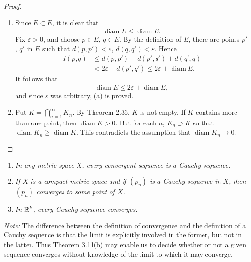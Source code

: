 \begin{proof}
\begin{enumerate}[label=(\alph*), leftmargin=2.2em, itemsep=4pt, topsep=3pt]
  \item Since $E \subset \overline{E}$, it is clear that
        \[ \operatorname{diam} E \le \operatorname{diam} \overline{E}. \]
        Fix $\varepsilon > 0$, and choose $p \in \overline{E}$,
        $q \in \overline{E}$. By the definition of $\overline{E}$, there are
        points $p'$, $q'$ in $E$ such that $d(p,p') < \varepsilon$,
        $d(q,q') < \varepsilon$. Hence
        \begin{align*}
          d(p,q) &\le d(p,p') + d(p',q') + d(q',q)\\
                 &< 2\varepsilon + d(p',q') \le
                   2\varepsilon + \operatorname{diam} E.
        \end{align*}
        It follows that
        \[ \operatorname{diam} \overline{E} \le 2\varepsilon +
           \operatorname{diam} E, \]
        and since $\varepsilon$ was arbitrary, (a) is proved.
  \item Put $K = \bigcap_{n=1}^\infty K_n$. By Theorem 2.36, $K$ is not empty.
        If $K$ contains more than one point, then $\operatorname{diam} K > 0$.
        But for each $n$, $K_n \supset K$ so that
        $\operatorname{diam} K_n \ge \operatorname{diam} K$. This contradicts
        the assumption that $\operatorname{diam} K_n \to 0$.
\end{enumerate}
\end{proof}

\begin{enumerate}[label=(\alph*), leftmargin=2.2em, itemsep=2pt, topsep=3pt]
  \item \emph{In any metric space $X$, every convergent sequence is a Cauchy
        sequence.}
  \item \emph{If $X$ is a compact metric space and if $(p_n)$ is a Cauchy
        sequence in $X$, then $(p_n)$ converges to some point of $X$.}
  \item \emph{In $\mathbb{R}^k$, every Cauchy sequence converges.}
\end{enumerate}

\emph{Note:} The difference between the definition of convergence and the
definition of a Cauchy sequence is that the limit is explicitly involved in the
former, but not in the latter. Thus Theorem 3.11(b) may enable us to decide
whether or not a given sequence converges without knowledge of the limit to
which it may converge.

